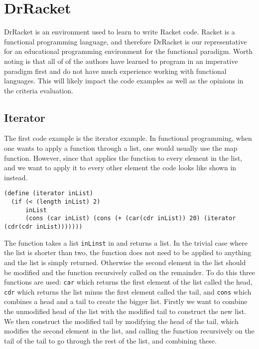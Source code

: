 \section{DrRacket}
\label{sec:drracket}
DrRacket is an environment used to learn to write Racket code.
Racket is a functional programming language, and therefore DrRacket is our representative for an educational programming environment for the functional paradigm.
Worth noting is that all of of the authors have learned to program in an imperative paradigm first and do not have much experience working with functional languages.
This will likely impact the code examples as well as the opinions in the criteria evaluation.

\subsection{Iterator}
The first code example is the iterator example.
In functional programming, when one wants to apply a function through a list, one would usually use the map function. However, since that applies the function to every element in the list, and we want to apply it to every other element the code looks like shown in  instead.

\begin{lstlisting}[caption={The iterator function in DrRacket}, label={DrRacket_iterator}]
(define (iterator inList)
  (if (< (length inList) 2)
      inList
      (cons (car inList) (cons (+ (car(cdr inList)) 20) (iterator (cdr(cdr inList)))))))
\end{lstlisting}

The function takes a list \lstinline!inLinst! in and returns a list.
In the trivial case where the list is shorter than two, the function does not need to be applied to anything and the list is simply returned.
Otherwise the second element in the list should be modified and the function recursively called on the remainder.
To do this three functions are used:
\lstinline!car! which returns the first element of the list called the head, \lstinline!cdr! which returns the list minus the first element called the tail, and \lstinline!cons! which combines a head and a tail to create the bigger list.
Firstly we want to combine the unmodified head of the list with the modified tail to construct the new list.
We then construct the modified tail by modifying the head of the tail, which modifies the second element in the list, and calling the function recursively on the tail of the tail to go through the rest of the list, and combining these.

